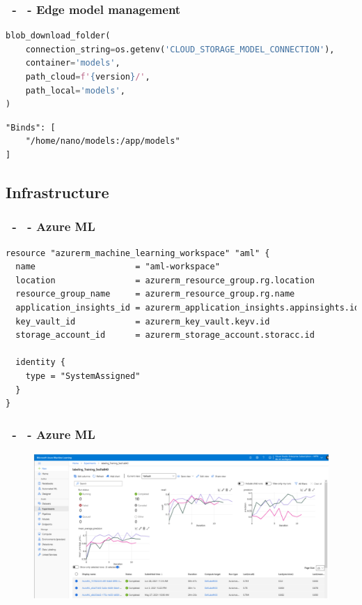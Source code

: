 \documentclass{beamer}
\begin{document}
\begin{frame}[fragile]
\frametitle{\secname\ - \subsecname\ - Edge model management}
    \begin{lstlisting}[language=Python]
blob_download_folder(
    connection_string=os.getenv('CLOUD_STORAGE_MODEL_CONNECTION'),
    container='models',
    path_cloud=f'{version}/',  
    path_local='models',
)
    \end{lstlisting}
    
    \begin{lstlisting}[language=HTML]
"Binds": [
    "/home/nano/models:/app/models"
]
    \end{lstlisting}
\end{frame}

\subsection{Infrastructure}

\begin{frame}[fragile]
\frametitle{\secname\ - \subsecname\ - Azure ML}
\begin{lstlisting}[language=HTML]
resource "azurerm_machine_learning_workspace" "aml" {
  name                    = "aml-workspace"
  location                = azurerm_resource_group.rg.location
  resource_group_name     = azurerm_resource_group.rg.name
  application_insights_id = azurerm_application_insights.appinsights.id
  key_vault_id            = azurerm_key_vault.keyv.id
  storage_account_id      = azurerm_storage_account.storacc.id

  identity {
    type = "SystemAssigned"
  }
}
\end{lstlisting}
\end{frame}

\begin{frame}
\frametitle{\secname\ - \subsecname\ - Azure ML}
\begin{figure}
    \includegraphics[width=0.9\linewidth]{Imagens/auto_ml.png}
\end{figure}
\end{frame}
\end{document}
